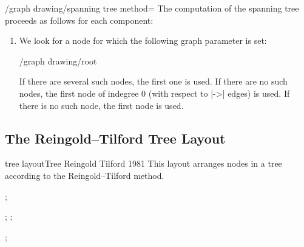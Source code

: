 {\begin{key}{/graph drawing/spanning tree method=}
  The computation of the spanning tree proceeds as follows for each component:
  \begin{enumerate}
  \item We look for a node for which the following graph parameter is
    set:
    \begin{key}{/graph drawing/root}
    \end{key}
    If there are several such nodes, the first one is used. If there
    are no such nodes, the first node of indegree 0 (with respect to
    |->| edges) is used. If there is no such node, the first node is
    used. 
  \end{enumerate}
\end{key}




\subsection{The Reingold--Tilford Tree Layout}

\begin{gdalgorithm}{tree layout}{Tree Reingold Tilford 1981}
  This layout arranges nodes in a tree according to the
  Reingold--Tilford method.
\begin{codeexample}[]
\tikz [binary tree layout, sibling distance=7mm, level distance=10mm]
\graph [nodes={circle, inner sep=0pt, minimum size=2mm, fill}]{
  / -- { / -- / -- { / -- /, / -- { /, / }}, / -- / -- /[second] }
};
\end{codeexample}
\begin{codeexample}[]
\tikz {};\qquad
\tikz {};
\end{codeexample}
\begin{codeexample}[]
\tikz {};
\end{codeexample}
\end{gdalgorithm}

}
